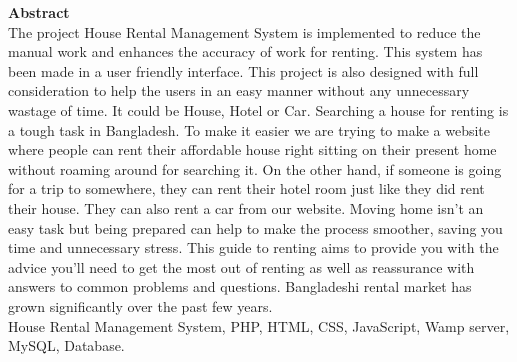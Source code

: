 \documentclass[12pt,a4paper]{report}
\newcommand\tab[1][0cm]{\hspace*{#1}}
\begin{document}
\begin{titlepage}
		{\fontsize{20}{10}\selectfont \textbf{Abstract}}\\
		\vspace{0.6cm}
		\justify \tab  The project House Rental Management System is implemented to reduce the
manual work and enhances the accuracy of work for renting. This system has been made
in a user friendly interface. This project is also designed with full consideration to help the
users in an easy manner without any unnecessary wastage of time. It could be House, Hotel or Car. Searching a house for renting is a
tough task in Bangladesh. To make it easier we are trying to make a website where people can rent
their affordable house right sitting on their present home without roaming around for searching it.
On the other hand, if someone is going for a trip to somewhere, they can rent their hotel room just
like they did rent their house. They can also rent a car from our website.
Moving home isn’t an easy task but being prepared can help to make the process smoother,
saving you time and unnecessary stress.
This guide to renting aims to provide you with the advice you’ll need to get the most out of renting
as well as reassurance with answers to common problems and questions. Bangladeshi rental market
has grown significantly over the past few years.\\

 House Rental Management System, PHP, HTML, CSS, JavaScript, Wamp server, MySQL, Database.

	\end{titlepage}
	
	
		\newpage
\end{document}
